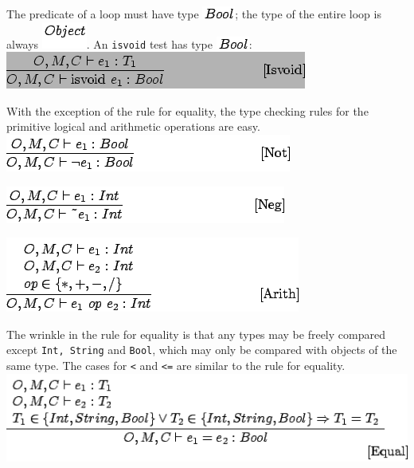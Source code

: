 \documentclass[]{article}
\begin{document}
The predicate of a loop must have type \includegraphics{img101.png}; the
type of the entire loop is always \includegraphics{img102.png}. An
\texttt{isvoid} test has type \includegraphics{img101.png}: \\

\includegraphics{img103.png}

With the exception of the rule for equality, the type checking rules for
the primitive logical and arithmetic operations are easy. \\

\includegraphics{img104.png}

\includegraphics{img106.png}

\includegraphics{img107.png}

The wrinkle in the rule for equality is that any types may be freely
compared except \texttt{Int, String} and \texttt{Bool}, which may only
be compared with objects of the same type. The cases for
\texttt{\textless{}} and \texttt{\textless{}=} are similar to the rule
for equality. \\

\includegraphics{img108.png}
\end{document}
